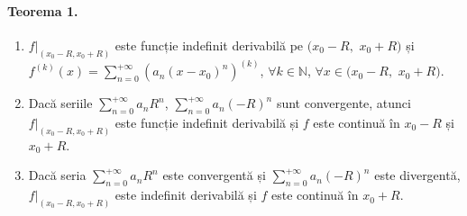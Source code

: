 \paragraph{Teorema 1.}
\begin{enumerate}[label=\emph{\alph*})]
	\item $f|_{(x_{0} - R, x_{0} + R)}$ este funcție indefinit
        derivabilă pe $(x_{0} - R,$ $x_{0} + R)$ și \\ 
        $f^{(k)}(x) = \displaystyle\sum_{n=0}^{+\infty}(a_{n}(x-x_{0})^{n})^{(k)}$,
        $\forall k \in \mathbb{N}$, $\forall x \in (x_{0} - R,$ $x_{0} + R)$. 
	\item Dacă seriile $\displaystyle\sum_{n=0}^{+\infty}a_{n}R^{n}$, $\displaystyle\sum_{n=0}^{+\infty}a_{n}(-R)^{n}$ sunt convergente, atunci $f|_{(x_{0} - R, x_{0} + R)}$ este funcție
	indefinit derivabilă și $f$ este continuă în $x_{0} - R$ și $x_{0} + R$.
	\item Dacă seria $\displaystyle\sum_{n=0}^{+\infty}a_{n}R^{n}$ este convergentă și $\displaystyle\sum_{n=0}^{+\infty}a_{n}(-R)^{n}$ este divergentă, $f|_{(x_{0} - R, x_{0} + R)}$ este
	indefinit derivabilă și $f$ este continuă în $x_{0} + R$.
\end{enumerate}
